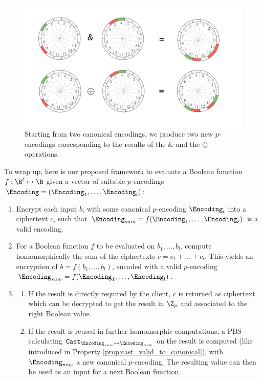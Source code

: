 \begin{figure}
    \centering
    \includegraphics[width=\textwidth]{images/operators.png}
    \caption{Starting from two canonical encodings, we produce two new $p$-encodings corresponding to the results of the $\&$ and the $\oplus$ operations.}
    \label{fig:operations}
\end{figure}


To wrap up, here is our proposed framework to evaluate a Boolean function $f: \B^\ell \mapsto \B$ given a vector of suitable $p$-encodings $\Encoding = (\Encoding_1, \dots, \Encoding_l)$:

\begin{enumerate}
\item Encrypt each input $b_i$ with some canonical $p$-encoding $\Encoding_i$ into a ciphertext $c_i$ such that $\Encoding_{sum} = f(\Encoding_1, \dots, \Encoding_\ell)$ is a valid encoding.
\item For a Boolean function $f$ to be evaluated on $b_1, \dots, b_l$, compute homomorphically the sum of the ciphertexts $c = c_1 + \dots + c_l$. This yields an encryption of $b = f(b_1, \dots, b_l)$, encoded with a valid $p$-encoding $\Encoding_{sum} = f(\Encoding_1, \dots, \Encoding_l)$.
\item \begin{enumerate}
    \item If the result is directly required by the client, $c$ is returned as ciphertext which can be decrypted to get the result in $\Z_p$ and associated to the right Boolean value.
    \item If the result is reused in further homomorphic computations, a PBS calculating $\texttt{Cast}_{\Encoding_{sum} \mapsto \Encoding_{new}}$ on the result is computed (like introduced in Property \ref{prop:cast_valid_to_canonical}), with $\Encoding_{new}$ a new canonical $p$-encoding. The resulting value can then be used as an input for a next Boolean function.
    \end{enumerate}
\end{enumerate}

